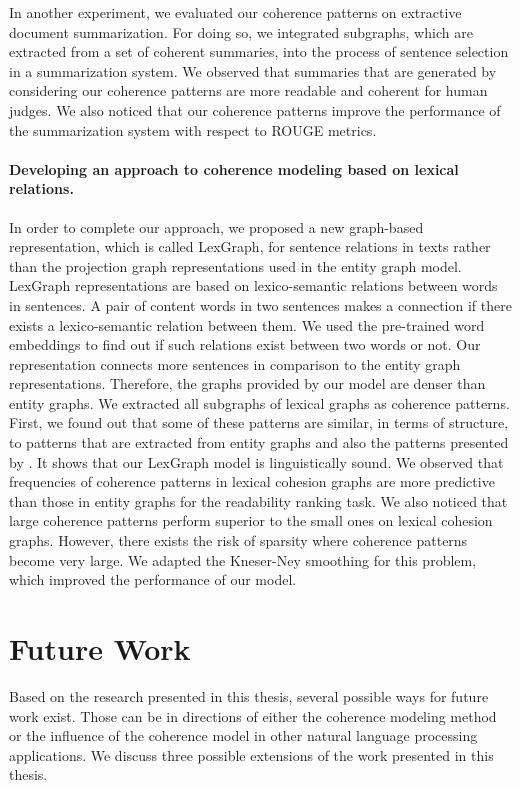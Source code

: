 In another experiment, we evaluated our coherence patterns on extractive document summarization. 
For doing so, we integrated subgraphs, which are extracted from a set of coherent summaries, into the process of sentence selection in a summarization system. 
We observed that summaries that are generated by considering our coherence patterns are more readable and coherent for human judges. 
We also noticed that our coherence patterns improve the performance of the summarization system with respect to ROUGE metrics. 

\paragraph{Developing an approach to coherence modeling based on lexical relations.} 
In order to complete our approach, we proposed a new graph-based representation, which is called \mbox{LexGraph}, for sentence relations in texts rather than the projection graph representations used in the entity graph model.   
LexGraph representations are based on lexico-semantic relations between words in sentences.
A pair of content words in two sentences makes a connection if there exists a lexico-semantic relation between them. 
We used the pre-trained word embeddings to find out if such relations exist between two words or not.  
Our representation connects more sentences in comparison to the entity graph representations. 
Therefore, the graphs provided by our model are denser than entity graphs. 
We extracted all subgraphs of lexical graphs as coherence patterns. 
First, we found out that some of these patterns are similar, in terms of structure, to patterns that are extracted from entity graphs and also the patterns presented by .
It shows that our LexGraph model is linguistically sound. 
We observed that frequencies of coherence patterns in lexical cohesion graphs are more predictive than those in entity graphs for the readability ranking task. 
We also noticed that large coherence patterns perform superior to the small ones on lexical cohesion graphs.  
However, there exists the risk of sparsity where coherence patterns become very large. 
We adapted the Kneser-Ney smoothing for this problem, which improved the performance of our model. 

\section{Future Work}
\label{sec:conc-future_work}

Based on the research presented in this thesis, several possible ways for future work exist. 
Those can be in directions of either the coherence modeling method or the influence of the coherence model in other natural language processing applications.   
We discuss three possible extensions of the work presented in this thesis. 

